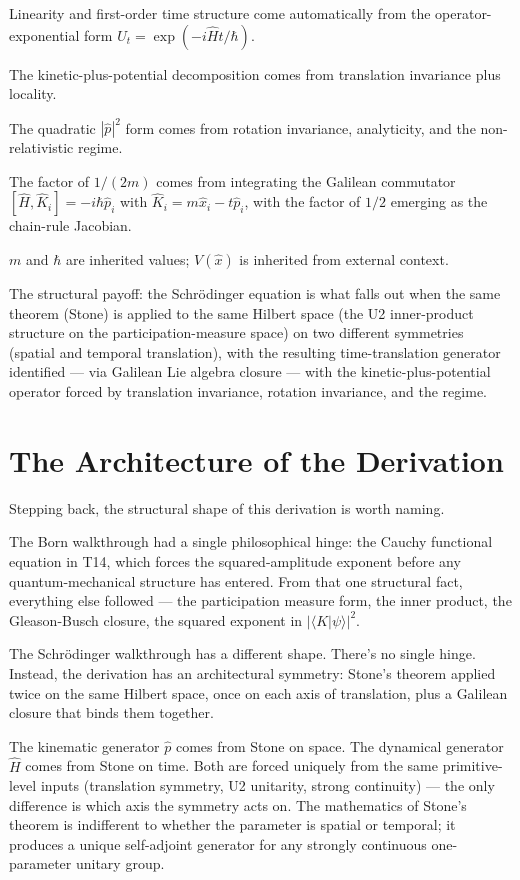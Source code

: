 \documentclass[11pt,a4paper]{article}
\begin{document}
Linearity and first-order time structure come automatically from the operator-exponential form $U_t = \exp(-i\hat{H}t/\hbar)$.

The kinetic-plus-potential decomposition comes from translation invariance plus locality.

The quadratic $|\hat{p}|^{2}$ form comes from rotation invariance, analyticity, and the non-relativistic regime.

The factor of $1/(2m)$ comes from integrating the Galilean commutator $[\hat{H}, \hat{K}_i] = -i\hbar\hat{p}_i$ with $\hat{K}_i = m\hat{x}_i - t\hat{p}_i$, with the factor of $1/2$ emerging as the chain-rule Jacobian.

$m$ and $\hbar$ are inherited values; $V(\hat{x})$ is inherited from external context.

The structural payoff: the Schr\"odinger equation is what falls out when the same theorem (Stone) is applied to the same Hilbert space (the U2 inner-product structure on the participation-measure space) on two different symmetries (spatial and temporal translation), with the resulting time-translation generator identified --- via Galilean Lie algebra closure --- with the kinetic-plus-potential operator forced by translation invariance, rotation invariance, and the regime.

\section{The Architecture of the Derivation}

Stepping back, the structural shape of this derivation is worth naming.

The Born walkthrough had a single philosophical hinge: the Cauchy functional equation in T14, which forces the squared-amplitude exponent before any quantum-mechanical structure has entered. From that one structural fact, everything else followed --- the participation measure form, the inner product, the Gleason-Busch closure, the squared exponent in $|\langle K|\psi\rangle|^{2}$.

The Schr\"odinger walkthrough has a different shape. There's no single hinge. Instead, the derivation has an architectural symmetry: Stone's theorem applied twice on the same Hilbert space, once on each axis of translation, plus a Galilean closure that binds them together.

The kinematic generator $\hat{p}$ comes from Stone on space. The dynamical generator $\hat{H}$ comes from Stone on time. Both are forced uniquely from the same primitive-level inputs (translation symmetry, U2 unitarity, strong continuity) --- the only difference is which axis the symmetry acts on. The mathematics of Stone's theorem is indifferent to whether the parameter is spatial or temporal; it produces a unique self-adjoint generator for any strongly continuous one-parameter unitary group.
\end{document}
